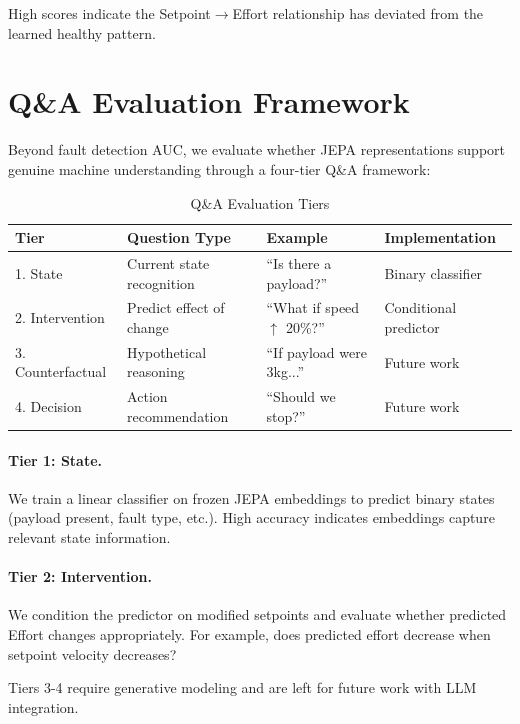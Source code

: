 \documentclass{article}
\begin{document}
High scores indicate the Setpoint$\rightarrow$Effort relationship has deviated from the learned healthy pattern.

\section{Q\&A Evaluation Framework}

Beyond fault detection AUC, we evaluate whether JEPA representations support genuine machine understanding through a four-tier Q\&A framework:

\begin{table}[h]
\centering
\caption{Q\&A Evaluation Tiers}
\small
\begin{tabular}{llll}
\toprule
\textbf{Tier} & \textbf{Question Type} & \textbf{Example} & \textbf{Implementation} \\
\midrule
1. State & Current state recognition & ``Is there a payload?'' & Binary classifier \\
2. Intervention & Predict effect of change & ``What if speed $\uparrow$ 20\%?'' & Conditional predictor \\
3. Counterfactual & Hypothetical reasoning & ``If payload were 3kg...'' & Future work \\
4. Decision & Action recommendation & ``Should we stop?'' & Future work \\
\bottomrule
\end{tabular}
\end{table}

\paragraph{Tier 1: State.} We train a linear classifier on frozen JEPA embeddings to predict binary states (payload present, fault type, etc.). High accuracy indicates embeddings capture relevant state information.

\paragraph{Tier 2: Intervention.} We condition the predictor on modified setpoints and evaluate whether predicted Effort changes appropriately. For example, does predicted effort decrease when setpoint velocity decreases?

Tiers 3-4 require generative modeling and are left for future work with LLM integration.
\end{document}
